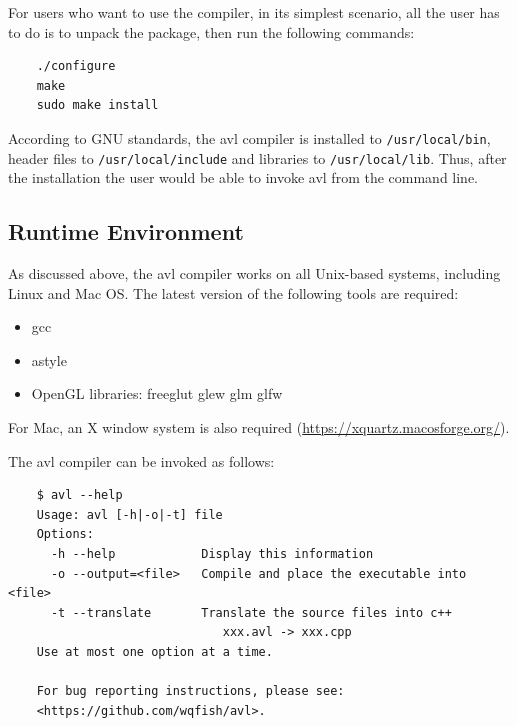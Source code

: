 For users who want to use the compiler, in its simplest scenario, all the user has to do is to
unpack the package, then run the following commands:

\begin{verbatim}
    ./configure
    make
    sudo make install
\end{verbatim}

According to GNU standards, the avl compiler is installed to \verb"/usr/local/bin", header files to
\verb"/usr/local/include" and libraries to \verb"/usr/local/lib". Thus, after the installation the
user would be able to invoke avl from the command line.

\subsection{Runtime Environment}

As discussed above, the avl compiler works on all Unix-based systems, including Linux and Mac OS.
The latest version of the following tools are required:

\begin{itemize}
  \item gcc
  \item astyle
  \item OpenGL libraries: freeglut glew glm glfw
\end{itemize}

For Mac, an X window system is also required (\url{https://xquartz.macosforge.org/}).

The avl compiler can be invoked as follows:

\begin{verbatim}
    $ avl --help
    Usage: avl [-h|-o|-t] file
    Options:
      -h --help            Display this information
      -o --output=<file>   Compile and place the executable into <file>
      -t --translate       Translate the source files into c++
                              xxx.avl -> xxx.cpp
    Use at most one option at a time.

    For bug reporting instructions, please see:
    <https://github.com/wqfish/avl>.
\end{verbatim}
